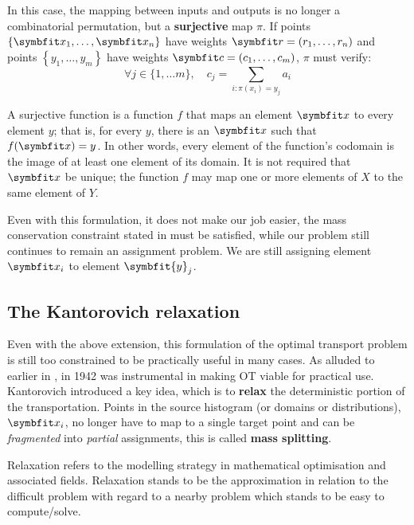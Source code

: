 In this case, the mapping between inputs and outputs is no longer a combinatorial permutation, but a \textbf{surjective} map $\pi$. If points $\{\bfitx_1, \ldots, \bfitx_n\}$ have weights $\bfitr=\left(r_1, \ldots, r_n\right)$ and points $\left\{y_1, \ldots, y_m\right\}$ have weights $\bfitc=\left(c_1, \ldots, c_m\right)$, $\pi$ must verify:
\begin{equation}
    \forall j \in\{1, \ldots m\}, \quad c_{j}=\sum_{i: \pi\left(x_{i}\right)=y_{j}} a_{i}
    \label{eqn:ot-mass-conserv}
\end{equation}

\begin{tcolorbox}[title=Surjective functions]
A surjective function is a function $f$ that maps an element $\bfitx$ to every element $y$; that is, for every $y$, there is an $\bfitx$ such that $f(\bfitx) = y$. In other words, every element of the function's codomain is the image of at least one element of its domain. It is not required that $\bfitx$ be unique; the function $f$ may map one or more elements of $X$ to the same element of $Y$. 
\end{tcolorbox}

Even with this formulation, it does not make our job easier, the mass conservation constraint stated in  must be satisfied, while our problem still continues to remain an assignment problem. We are still assigning element $\bfitx_i$ to element $\symbfit{y}_j$.

\subsection{The Kantorovich relaxation}\label{ssec:ot-kantorovich-relax}

Even with the above extension, this formulation of the optimal transport problem is still too constrained to be practically useful in many cases. As alluded to earlier in , in 1942 \citeauthor{Kantorovich42} was instrumental in making OT viable for practical use. Kantorovich introduced a key idea, which is to \textbf{relax} the deterministic portion of the transportation. Points in the source histogram (or domains or distributions), $\bfitx_i$, no longer have to map to a single target point and can be \textit{fragmented} into \textit{partial} assignments, this is called \textbf{mass splitting}.

\begin{tcolorbox}[title=Relaxation]
Relaxation refers to the modelling strategy in mathematical optimisation and associated fields. Relaxation stands to be the approximation in relation to the difficult problem with regard to a nearby problem which stands to be easy to compute/solve.
\end{tcolorbox}

